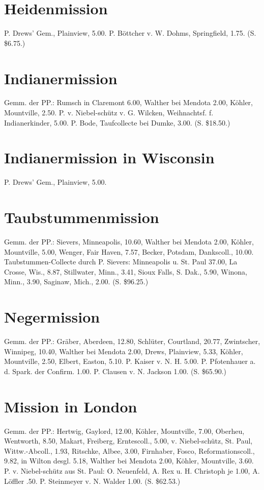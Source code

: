 
\section{Heidenmission}
P. Drews’ Gem., Plainview, 5.00. P. Böttcher v. W. Dohms, Springfield, 1.75. (S. \$6.75.)

\section{Indianermission}
Gemm. der PP.: Rumsch in Claremont 6.00, Walther bei Mendota 2.00, Köhler, Mountville, 2.50. P. v. Niebel-schütz v. G. Wilcken, Weihnachtsf. f. Indianerkinder, 5.00. P. Bode, Taufcollecte bei Dumke, 3.00. (S. \$18.50.)

\section{Indianermission in Wisconsin}
P. Drews’ Gem., Plainview, 5.00.

\section{Taubstummenmission}
Gemm. der PP.: Sievers, Minneapolis, 10.60, Walther bei Mendota 2.00, Köhler, Mountville, 5.00, Wenger, Fair Haven, 7.57, Becker, Potsdam, Dankscoll., 10.00. Taubstummen-Collecte durch P. Sievers: Minneapolis u. St. Paul 37.00, La Crosse, Wis., 8.87, Stillwater, Minn., 3.41, Sioux Falls, S. Dak., 5.90, Winona, Minn., 3.90, Saginaw, Mich., 2.00. (S. \$96.25.)

\section{Negermission}
Gemm. der PP.: Gräber, Aberdeen, 12.80, Schlüter, Courtland, 20.77, Zwintscher, Winnipeg, 10.40, Walther bei Mendota 2.00, Drews, Plainview, 5.33, Köhler, Mountville, 2.50, Elbert, Easton, 5.10. P. Kaiser v. N. H. 5.00. P. Pfotenhauer a. d. Spark. der Confirm. 1.00. P. Clausen v. N. Jackson 1.00. (S. \$65.90.)

\section{Mission in London}
Gemm. der PP.: Hertwig, Gaylord, 12.00, Köhler, Mountville, 7.00, Oberheu, Wentworth, 8.50, Makart, Freiberg, Erntescoll., 5.00, v. Niebel-schütz, St. Paul, Wittw.-Abcoll., 1.93, Ritschke, Albee, 3.00, Firnhaber, Fosco, Reformationscoll., 9.82, in Wilton desgl. 5.18, Walther bei Mendota 2.00, Köhler, Mountville, 3.60. P. v. Niebel-schütz aus St. Paul: O. Neuenfeld, A. Rex u. H. Christoph je 1.00, A. Löffler .50. P. Steinmeyer v. N. Walder 1.00. (S. \$62.53.)

